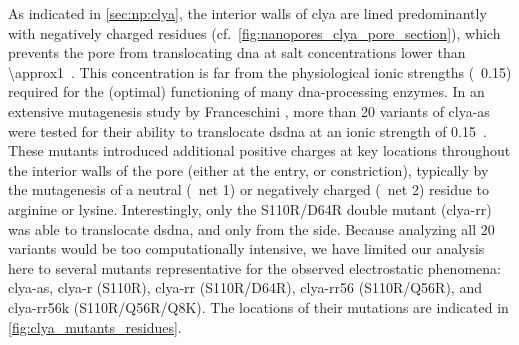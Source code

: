 As indicated in \cref{sec:np:clya}, the interior walls of \gls{clya} are lined predominantly with negatively
charged residues (cf.~\cref{fig:nanopores_clya_pore_section}), which prevents the pore from translocating
\gls{dna} at salt concentrations lower than \SI{\approx1}{\Molar}~\cite{Franceschini-2013,Franceschini-2016}.
This concentration is far from the physiological ionic strengths (\ie~\SI{0.15}{\Molar}) required for the
(optimal) functioning of many \gls{dna}-processing enzymes. In an extensive mutagenesis study by Franceschini
\etal, more than 20 variants of \gls{clya-as} were tested for their ability to translocate \gls{dsdna} at an
ionic strength of \SI{0.15}{\Molar}~\cite{Franceschini-2016}. These mutants introduced additional positive
charges at key locations throughout the interior walls of the pore (either at the \cisi{} entry, \lumen{} or
\transi{} constriction), typically by the mutagenesis of a neutral (\ie~net \SI{+1}{\ec}) or negatively
charged (\ie~net \SI{+2}{\ec}) residue to arginine or lysine. Interestingly, only the S110R/D64R double mutant
(\gls{clya-rr}) was able to translocate \gls{dsdna}, and only from the \cisi{} side. Because analyzing all 20
variants would be too computationally intensive, we have limited our analysis here to several mutants
representative for the observed electrostatic phenomena: \gls{clya-as}, \gls{clya-r} (S110R), \gls{clya-rr}
(S110R/D64R), \gls{clya-rr56} (S110R/Q56R), and \gls{clya-rr56k} (S110R/Q56R/Q8K). The locations of their
mutations are indicated in \cref{fig:clya_mutants_residues}.

